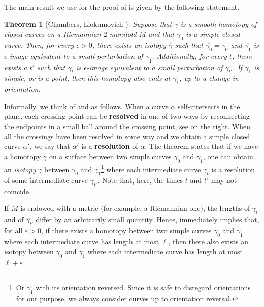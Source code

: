\documentclass[10pt,a4paper]{amsart}
\newtheorem{theorem}{Theorem}[section]
\begin{document}
The main result we use for the proof of  is given by the following statement.

\begin{theorem}[Chambers, Liokumovich {\cite[Theorem 1.1']{Chambers_homo-isotopy}}]\label{Chambers_homo-isotopy}
Suppose that $\gamma$ is a smooth homotopy of closed curves on a Riemannian $2$-manifold $M$ and that $\gamma_0$ is a simple closed curve. Then, for every $\epsilon > 0$, there exists an isotopy $\overline{\gamma}$ such that $\overline{\gamma_0} = \gamma_0$ and $\overline{\gamma_1}$ is $\epsilon$-image equivalent to a small perturbation of $\gamma_1$. Additionally, for every $t$, there exists a $t'$ such that $\overline{\gamma_t}$ is $\epsilon$-image equivalent to a small perturbation of $\gamma_{t'}$. If $\gamma_1$ is simple, or is a point, then this homotopy also ends at $\gamma_1$, up to a change in orientation.
\end{theorem}

Informally, we think of  and  as follows. When a curve $\alpha$ self-intersects in the plane, each crossing point can be \textbf{resolved} in one of two ways by reconnecting the endpoints in a small ball around the crossing point, see  on the right. When all the crossings have been resolved in some way and we obtain a simple closed curve $\alpha'$, we say that $\alpha'$ is a \textbf{resolution} of $\alpha$. The theorem states that if we have a homotopy $\gamma$ on a surface between two simple curves $\gamma_0$ and $\gamma_1$, one can obtain an \emph{isotopy} $\overline{\gamma}$ between $\gamma_0$ and $\gamma_1$\footnote{Or $\gamma_1$ with its orientation reversed. Since it is safe to disregard orientations for our purpose, we always consider curves up to orientation reversal.} where each intermediate curve $\overline{\gamma_t}$ is a resolution of some intermediate curve $\gamma_{t'}$. Note that, here, the times $t$ and $t'$ may not coincide. 

If $M$ is endowed with a metric (for example, a Riemannian one), the lengths of $\gamma_t$ and of $\overline{\gamma_{t'}}$ differ by an arbitrarily small quantity. Hence,  immediately implies that, for all $\varepsilon>0$, if there exists a homotopy between two simple curves $\gamma_0$ and $\gamma_1$ where each intermediate curve has length at most $\ell$, then there also exists an isotopy between $\gamma_0$ and $\gamma_1$ where each intermediate curve has length at most $\ell+\varepsilon$.
\end{document}
